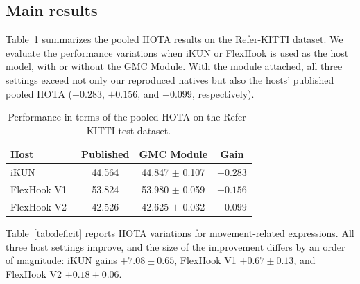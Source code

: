 \documentclass{article}
\begin{document}
\subsection{Main results}
\label{sec:main}
Table~\ref{tab:main} summarizes the pooled HOTA results on the Refer-KITTI dataset. We evaluate the performance variations when iKUN or FlexHook is used as the host model, with or without the GMC Module. With the module attached, all three settings exceed not only our reproduced natives but also the hosts' published pooled HOTA ($+0.283$, $+0.156$, and $+0.099$, respectively).


\begin{table}
  \centering
  \caption{Performance in terms of the pooled HOTA on the Refer-KITTI test dataset.}
  \label{tab:main}
  \small
  \setlength{\tabcolsep}{2pt}
  \begin{tabular}{lccc}
    \hline
    Host                        & Published & GMC Module           & Gain                      \\
    \hline
    iKUN~\cite{ikun}            & 44.564    & 44.847 $\pm$ 0.107 & $+0.283$ \\
    FlexHook V1~\cite{flexhook} & 53.824    & 53.980 $\pm$ 0.059 & $+0.156$ \\
    FlexHook V2~\cite{flexhook} & 42.526    & 42.625 $\pm$ 0.032 & $+0.099$ \\
    \hline
  \end{tabular}
\end{table}


Table~\ref{tab:deficit} reports HOTA variations for movement-related expressions. All three host settings improve, and the size of the improvement differs by an order of magnitude: iKUN gains $+7.08\pm0.65$, FlexHook V1 $+0.67\pm0.13$, and FlexHook V2 $+0.18\pm0.06$.

\end{document}
